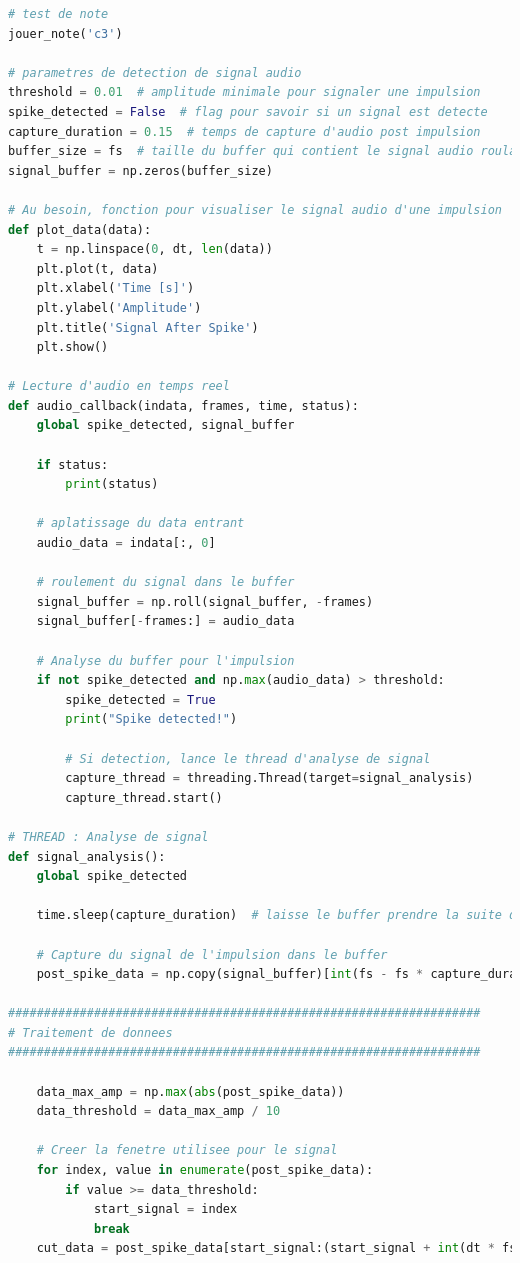 ﻿\documentclass[11pt,letterpaper]{article}
\begin{document}
\begin{lstlisting}[language=python]
# test de note
jouer_note('c3')

# parametres de detection de signal audio
threshold = 0.01  # amplitude minimale pour signaler une impulsion
spike_detected = False  # flag pour savoir si un signal est detecte
capture_duration = 0.15  # temps de capture d'audio post impulsion
buffer_size = fs  # taille du buffer qui contient le signal audio roulant
signal_buffer = np.zeros(buffer_size)

# Au besoin, fonction pour visualiser le signal audio d'une impulsion
def plot_data(data):
    t = np.linspace(0, dt, len(data))
    plt.plot(t, data)
    plt.xlabel('Time [s]')
    plt.ylabel('Amplitude')
    plt.title('Signal After Spike')
    plt.show()

# Lecture d'audio en temps reel
def audio_callback(indata, frames, time, status):
    global spike_detected, signal_buffer
    
    if status:
        print(status)
    
    # aplatissage du data entrant
    audio_data = indata[:, 0]
    
    # roulement du signal dans le buffer
    signal_buffer = np.roll(signal_buffer, -frames)
    signal_buffer[-frames:] = audio_data
    
    # Analyse du buffer pour l'impulsion
    if not spike_detected and np.max(audio_data) > threshold:
        spike_detected = True
        print("Spike detected!")
    
        # Si detection, lance le thread d'analyse de signal
        capture_thread = threading.Thread(target=signal_analysis)
        capture_thread.start()

# THREAD : Analyse de signal
def signal_analysis():
    global spike_detected
    
    time.sleep(capture_duration)  # laisse le buffer prendre la suite du signal post impulsion

    # Capture du signal de l'impulsion dans le buffer
    post_spike_data = np.copy(signal_buffer)[int(fs - fs * capture_duration - 800):]
    
##################################################################
# Traitement de donnees
##################################################################

    data_max_amp = np.max(abs(post_spike_data))
    data_threshold = data_max_amp / 10

    # Creer la fenetre utilisee pour le signal
    for index, value in enumerate(post_spike_data):
        if value >= data_threshold:
            start_signal = index
            break
    cut_data = post_spike_data[start_signal:(start_signal + int(dt * fs))].flatten()


\end{lstlisting}
\end{document}
